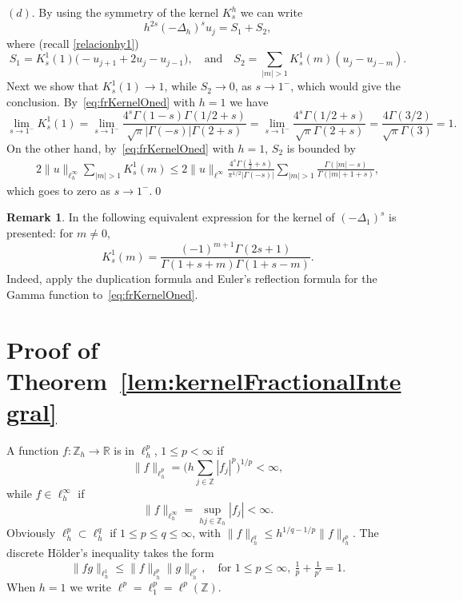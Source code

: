 \documentclass[a4paper,11pt,reqno]{amsart}
\newcommand{\R}{\mathbb{R}}
\newcommand{\Z}{\mathbb{Z}}
\theoremstyle{definition}
\newtheorem{rem}[thm]{Remark}
\numberwithin{equation}{section}
\begin{document}
\noindent$(d)$. By using the symmetry of the kernel $K_s^h$ we can write
\[
h^{2s}(-\Delta_h)^s u_{j} = S_1+S_2,
\]
where (recall \eqref{relacionhy1})
\[
S_1 = K^1_s(1) \bigl(-u_{j+1}+2u_{j}-u_{j-1}\bigr),\quad\text{and}\quad
S_2 = \sum_{|m|>1}K^1_s(m)(u_j-u_{j-m}).
\]
Next we show that $K^1_s(1)\to1$, while $S_2\to0$, as $s\to1^-$, which would give the conclusion. By~\eqref{eq:frKernelOned} with $h=1$ we have
\[
\lim_{s\to 1^-}K^1_s(1) = \lim_{s\to 1^-} \frac{4^s\Gamma(1-s)\Gamma(1/2+s)}{\sqrt{\pi}|\Gamma(-s)|\Gamma(2+s)}
= \lim_{s\to 1^-}\frac{4^s\Gamma(1/2+s)}{\sqrt{\pi}\Gamma(2+s)}
= \frac{4\Gamma(3/2)}{\sqrt{\pi}\Gamma(3)}=1.
\]
On the other hand, by~\eqref{eq:frKernelOned} with $h=1$, $S_2$ is bounded by
\begin{align*}
2\|u\|_{\ell^\infty_h}\sum_{|m|>1}K^1_s(m)\le 2\|u\|_{\ell^\infty}
\frac{4^s\Gamma(\frac{1}{2}+s)}{\pi^{1/2}|\Gamma(-s)|}
\sum_{|m|>1}\frac{\Gamma(|m|-s)}{\Gamma(|m|+1+s)},
\end{align*}
which goes to zero as $s\to1^-$.\qed

\begin{rem}
In \cite[formula~(5)]{CLRV} the following equivalent expression for the kernel of $(-\Delta_1)^s$ is presented:
for $m\neq0$,
$$
K_s^1(m)=\frac{(-1)^{m+1}\Gamma(2s+1)}{\Gamma(1+s+m)\Gamma(1+s-m)}.
$$
Indeed, apply the duplication formula
and Euler's reflection formula for the Gamma function to~\eqref{eq:frKernelOned}.
\end{rem}

\section{Proof of Theorem~\ref{lem:kernelFractionalIntegral}}
\label{sec:dicreteFractional}

A function $f:\Z_h\to\R$ is in $\ell^p_h$, $1\leq p<\infty$ if
\begin{equation}
\label{Lph}
\|f\|_{\ell^p_h}=\bigg(h\sum_{j\in\Z}|f_j|^p\bigg)^{1/p}<\infty,
\end{equation}
while $f\in\ell^\infty_h$ if
\begin{equation}
\label{Linftyh}
\|f\|_{\ell^\infty_h}=\sup_{hj\in\Z_h}|f_j|<\infty.
\end{equation}
Obviously $\ell^p_h\subset\ell^q_h$ if $1\leq p\leq q\leq\infty$, 
with $\|f\|_{\ell^q_h}\leq h^{1/q-1/p}\|f\|_{\ell^p_h}$.
The discrete H\"older's inequality takes the form
\begin{equation}
\label{Holder}
\|fg\|_{\ell^1_h}\leq\|f\|_{\ell^p_h}\|g\|_{\ell^{p'}_h},
\quad\text{for } 1\leq p\leq\infty,\ \tfrac{1}{p}+\tfrac{1}{p'}=1.
\end{equation}
When $h=1$ we write $\ell^p=\ell^p_1=\ell^p(\Z)$.
\end{document}
